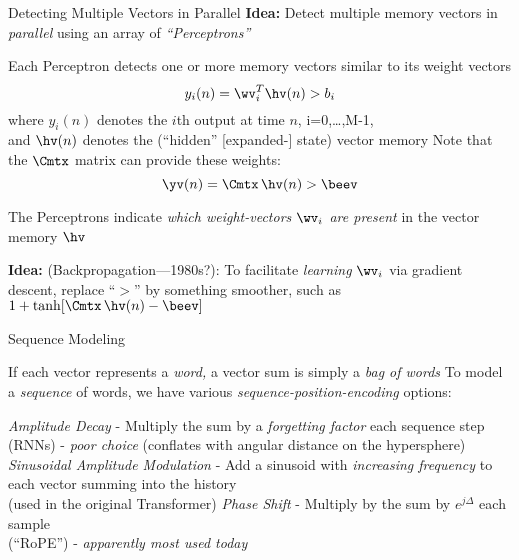 \begin{slide}[\slideopts,toc={Perceptrons}]{Detecting Multiple Vectors in Parallel}
\maybepause
\vspace{1em}
\textbf{Idea:} Detect multiple memory vectors in \emph{parallel} using an array of \emph{``Perceptrons''}
\begin{itemize}
  \mpitem Each Perceptron detects one or more memory vectors similar to its weight vectors
  \[
  y_i(n) = \wv_i^T\hv(n) > b_i
  \]
  where $y_i(n)$ denotes the $i$th output at time $n$, i=0,\ldots,M-1,\\
  and $\hv(n)$ denotes the (``hidden'' [expanded-] state) vector memory
  \mpitem Note that the $\Cmtx$ matrix can provide these weights:
  \[
  \yv(n) = \Cmtx\,\hv(n) > \beev
  \]

\mpitem The Perceptrons indicate \emph{which weight-vectors $\wv_i$ are present} in the vector memory $\hv$

\mpitem \textbf{Idea:} (Backpropagation---1980s?): To facilitate
\emph{learning} $\wv_i$ via gradient descent, replace ``$>$'' by
something smoother, such as $1+\tanh[\Cmtx\,\hv(n) - \beev]$

\end{itemize}

\end{slide}

\begin{slide}[\slideopts,toc={Sequences}]{Sequence Modeling}
  \vspace{-1em}
  \begin{itemize}
    \mpitem If each vector represents a \emph{word,} a vector sum is simply a \emph{bag of words}
    \mpitem To model a \emph{sequence} of words, we have various \emph{sequence-position-encoding} options:
    \begin{enumerate}
      \mpitem \emph{Amplitude Decay} - Multiply the sum by a \emph{forgetting factor} each sequence step\\
      (RNNs) - \emph{poor choice} (conflates with angular distance on the hypersphere)
      \mpitem \emph{Sinusoidal Amplitude Modulation} - Add a sinusoid with \emph{increasing frequency} to each vector summing into the history\\
      (used in the original Transformer)
      \mpitem \emph{Phase Shift} - Multiply by the sum by $e^{j\Delta}$ each sample\\
      (``RoPE'') - \emph{apparently most used today}
    \end{enumerate}
  \end{itemize}
\end{slide}

